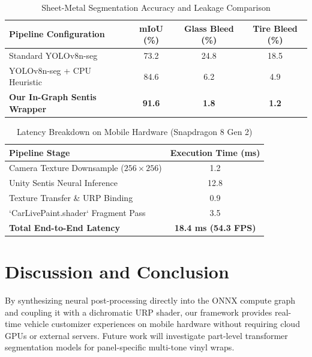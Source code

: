 \documentclass[10pt,journal,compsoc]{IEEEtran}
\begin{document}
\begin{table}[h]
\centering
\caption{Sheet-Metal Segmentation Accuracy and Leakage Comparison}
\label{tab:accuracy}
\begin{tabular}{@{}lccc@{}}
\toprule
\textbf{Pipeline Configuration} & \textbf{mIoU (\%)} & \textbf{Glass Bleed (\%)} & \textbf{Tire Bleed (\%)} \\
\midrule
Standard YOLOv8n-seg & 73.2 & 24.8 & 18.5 \\
YOLOv8n-seg + CPU Heuristic & 84.6 & 6.2 & 4.9 \\
\textbf{Our In-Graph Sentis Wrapper} & \textbf{91.6} & \textbf{1.8} & \textbf{1.2} \\
\bottomrule
\end{tabular}
\end{table}

\begin{table}[h]
\centering
\caption{Latency Breakdown on Mobile Hardware (Snapdragon 8 Gen 2)}
\label{tab:latency}
\begin{tabular}{@{}lc@{}}
\toprule
\textbf{Pipeline Stage} & \textbf{Execution Time (ms)} \\
\midrule
Camera Texture Downsample ($256 \times 256$) & 1.2 \\
Unity Sentis Neural Inference & 12.8 \\
Texture Transfer \& URP Binding & 0.9 \\
`CarLivePaint.shader` Fragment Pass & 3.5 \\
\midrule
\textbf{Total End-to-End Latency} & \textbf{18.4 ms (54.3 FPS)} \\
\bottomrule
\end{tabular}
\end{table}

\section{Discussion and Conclusion}
By synthesizing neural post-processing directly into the ONNX compute graph and coupling it with a dichromatic URP shader, our framework provides real-time vehicle customizer experiences on mobile hardware without requiring cloud GPUs or external servers. Future work will investigate part-level transformer segmentation models for panel-specific multi-tone vinyl wraps.



\end{document}
